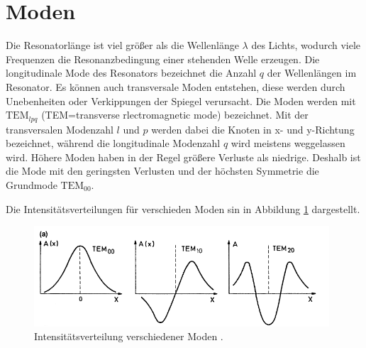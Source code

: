\section{Moden}
Die Resonatorlänge ist viel größer als die Wellenlänge $\lambda$ des Lichts, wodurch viele Frequenzen die
Resonanzbedingung einer stehenden Welle erzeugen.
Die longitudinale Mode des Resonators bezeichnet die Anzahl $q$ der Wellenlängen im Resonator. Es können
auch transversale Moden entstehen, diese werden durch Unebenheiten oder Verkippungen der Spiegel verursacht.
Die Moden werden mit $\text{TEM}_{lpq}$ (TEM=transverse rlectromagnetic mode) bezeichnet. Mit der
transversalen Modenzahl $l$ und $p$ werden dabei die Knoten in x- und y-Richtung bezeichnet,
während die longitudinale Modenzahl $q$ wird meistens weggelassen wird.
Höhere Moden haben in der Regel größere Verluste als niedrige. Deshalb ist die Mode mit den geringsten
Verlusten und der höchsten Symmetrie die Grundmode $\text{TEM}_{00}$.

Die Intensitätsverteilungen für verschieden Moden sin in Abbildung \ref{fig:TEM} dargestellt.
\begin{figure}[H]
  \centering
  \includegraphics[width=11cm]{TEM.png}
  \caption{Intensitätsverteilung verschiedener Moden \cite{springer}.}
  \label{fig:TEM}
\end{figure}

